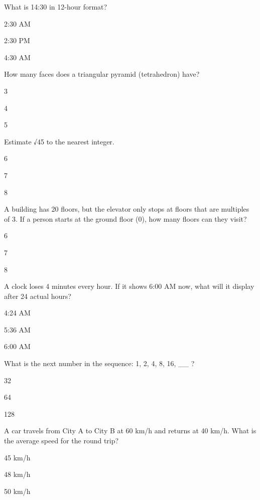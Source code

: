 \begin{enhancedmcq}{What is 14:30 in 12-hour format?}
\item 2:30 AM
\item 2:30 PM
\item 4:30 AM

\end{enhancedmcq}
\begin{enhancedmcq}{How many faces does a triangular pyramid (tetrahedron) have?}
\item 3
\item 4
\item 5

\end{enhancedmcq}
\begin{enhancedmcq}{Estimate √45 to the nearest integer.}
\item 6
\item 7
\item 8

\end{enhancedmcq}
\begin{enhancedmcq}{A building has 20 floors, but the elevator only stops at floors that are multiples of 3. If a person starts at the ground floor (0), how many floors can they visit?}
\item 6
\item 7
\item 8

\end{enhancedmcq}
\begin{enhancedmcq}{A clock loses 4 minutes every hour. If it shows 6:00 AM now, what will it display after 24 actual hours?}
\item 4:24 AM
\item 5:36 AM
\item 6:00 AM

\end{enhancedmcq}
\begin{enhancedmcq}{What is the next number in the sequence: 1, 2, 4, 8, 16, __ ?}
\item 32
\item 64
\item 128

\end{enhancedmcq}
\begin{enhancedmcq}{A car travels from City A to City B at 60 km/h and returns at 40 km/h. What is the average speed for the round trip?}
\item 45 km/h
\item 48 km/h
\item 50 km/h

\end{enhancedmcq}
